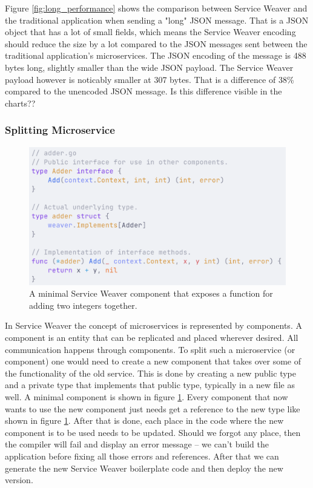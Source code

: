 \documentclass[sigconf,review,9pt]{acmart}
\begin{document}
Figure \ref{fig:long_performance} shows the comparison between Service Weaver and
the traditional application when sending a "long" JSON message.
That is a JSON object that has a lot of small fields, which means the Service Weaver
encoding should reduce the size by a lot compared to the JSON messages sent between
the traditional application's microservices.
The JSON encoding of the message is 488 bytes long, slightly smaller than the wide
JSON payload.
The Service Weaver payload however is noticably smaller at 307 bytes.
That is a difference of 38\% compared to the unencoded JSON message.
Is this difference visible in the charts??

\subsubsection{Splitting Microservice}

\begin{figure}
	\includegraphics[width=\columnwidth]{minimal_component}
	\caption{A minimal Service Weaver component that exposes a function
		for adding two integers together.}
	\label{fig:minimal_component}
\end{figure}

In Service Weaver the concept of microservices is represented by components.
A component is an entity that can be replicated and placed wherever desired.
All communication happens through components.
To split such a microservice (or component) one would need to create a new
component that takes over some of the functionality of the old service.
This is done by creating a new public type and a private type that implements
that public type, typically in a new file as well.
A minimal component is shown in figure \ref{fig:minimal_component}.
Every component that now wants to use the new component just needs get a reference
to the new type like shown in figure \ref{fig:minimal_component}.
After that is done, each place in the code where the new component is to be used
needs to be updated.
Should we forgot any place, then the compiler will fail and display an error message
-- we can't build the application before fixing all those errors and references.
After that we can generate the new Service Weaver boilerplate code and then deploy
the new version.
\end{document}
